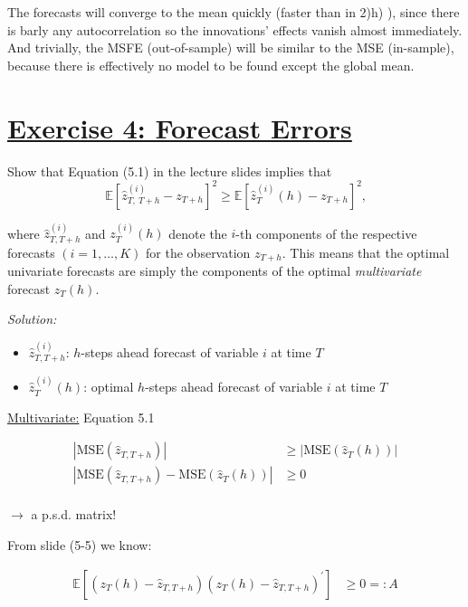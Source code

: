 \documentclass[12pt,a4paper]{article}
\newcommand{\tmpsection}[1]{}
\let\tmpsection=\section
\renewcommand{\section}[1]{\tmpsection{\underline{#1}} }
\begin{document}
The forecasts will converge to the mean quickly (faster than in 2)h) ),
since there is barly any autocorrelation so the innovations' effects
vanish almost immediately. And trivially, the MSFE (out-of-sample) will
be similar to the MSE (in-sample), because there is effectively no model
to be found except the global mean.

\hypertarget{exercise-4-forecast-errors}{%
\section{Exercise 4: Forecast Errors}\label{exercise-4-forecast-errors}}

Show that Equation (5.1) in the lecture slides implies that
\[ \mathbb{E} \left[ \hat{z}_{T,\ T + h}^{(i)} - z_{T+h} \right]^2 \geq \mathbb{E} \left[ \hat{z}_{T}^{(i)}  (h)- z_{T+h} \right]^2 \text{,}\]

where \(\hat{z}_{T, T+h}^{(i)}\) and \(z_T^{(i)} (h)\) denote the
\(i\)-th components of the respective forecasts \((i = 1, \dots ,K)\)
for the observation \(z_{T+h}\). This means that the optimal univariate
forecasts are simply the components of the optimal \emph{multivariate}
forecast \(z_T (h)\).

\emph{Solution:}

\begin{itemize}
  \item $\hat{z}_{T, T+h}^{(i)}$: $h$-steps ahead forecast of variable $i$ at time $T$ 
  \item $\hat{z}_{T}^{(i)} (h)$: optimal $h$-steps ahead forecast of variable $i$ at time $T$
\end{itemize}

\underline{Multivariate:} Equation 5.1

\begin{align*}
  \left| \text{MSE} \left( \hat{z}_{T, T+h} \right) \right| & \geq \left| \text{MSE} \left( \hat{z}_{T} (h) \right) \right| \\
  \left| \text{MSE} \left( \hat{z}_{T, T+h} \right) - \text{MSE} \left( \hat{z}_{T} (h) \right) \right| & \geq 0 \\
\end{align*}

\(\rightarrow\) a p.s.d. matrix!

From slide (5-5) we know:

\begin{align*}
  \mathbb{E} \left[ \left( z_T (h) - \hat{z}_{T, T+h}\right) \left( z_T (h) - \hat{z}_{T, T+h}\right)^{'} \right] & \geq 0 =: A\\
\end{align*}
\end{document}
